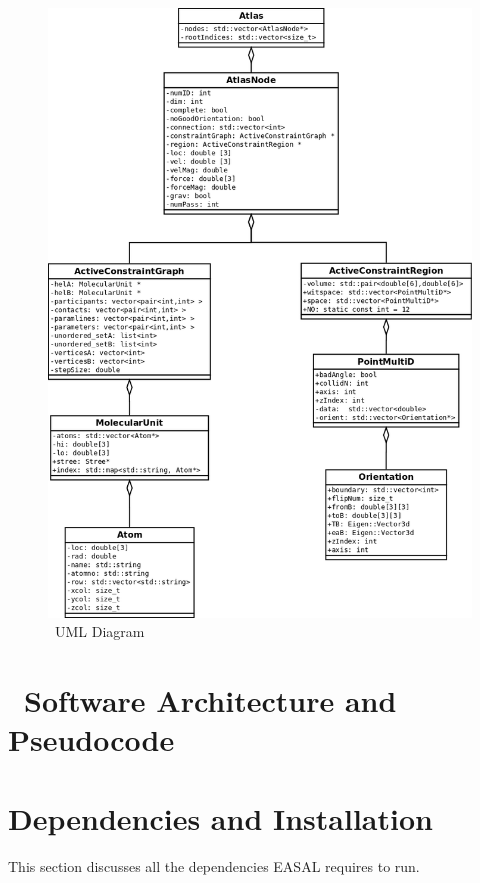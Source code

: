 \documentclass[10pt]{article}
\begin{document}
\begin{figure}[hp]
\centering
\includegraphics[scale=0.3] {fig/EASAL_UML.png}
\caption{\EASAL~UML Diagram}
\label{UML}
\end{figure}



\section{\EASAL~Software Architecture and Pseudocode}
\label{sec:architecture}


\section{Dependencies and Installation}
This section discusses all the dependencies EASAL requires to run.
\end{document}
